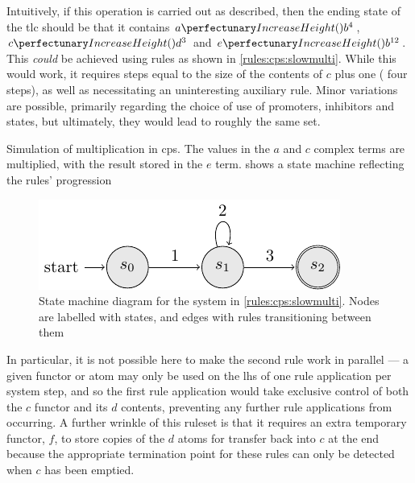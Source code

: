 Intuitively, if this operation is carried out as described, then the ending state of the \gls{tlc} should be that it contains \(\cpfunc{a}{b^4}\), \(\cpfunc{c}{d^3}\) and \(\cpfunc{e}{b^{12}}\).  This \emph{could} be achieved using rules as shown in \cref{rules:cps:slowmulti}.  While this would work, it requires steps equal to the size of the contents of \(c\) plus one (\ie{} four steps), as well as necessitating an uninteresting auxiliary rule.  Minor variations are possible, primarily regarding the choice of use of \glspl{promoter}, \glspl{inhibitor} and states, but ultimately, they would lead to roughly the same set.

\begin{cprulesetfloat}
    \begin{cpruleset}
        
    
    \end{cpruleset}
    \caption[Simulation of multiplication in cP systems]{\label{rules:cps:slowmulti}Simulation of multiplication in \gls{cps}.  The values in the \(a\) and \(c\) complex terms are multiplied, with the result stored in the \(e\) term.   shows a state machine reflecting the rules' progression}
\end{cprulesetfloat}

\begin{figure}
    \centering
    \includegraphics{chapters/cpsystems/ruleset1statemachine.pdf}
    \caption[State machine diagram for the system in \cref{rules:cps:slowmulti}]{State machine diagram for the system in \cref{rules:cps:slowmulti}.  Nodes are labelled with states, and edges with rules transitioning between them}
    \label{fig:cps:slowmulti}
\end{figure}

In particular, it is not possible here to make the second rule work in parallel --- a given \gls{functor} or atom may only be used on the \gls{lhs} of one rule application per system step, and so the first rule application would take exclusive control of both the \(c\) \gls{functor} and its \(d\) contents, preventing any further rule applications from occurring.  A further wrinkle of this \gls{ruleset} is that it requires an extra temporary \gls{functor}, \(f\), to store copies of the \(d\) atoms for transfer back into \(c\) at the end because the appropriate termination point for these rules can only be detected when \(c\) has been emptied.

